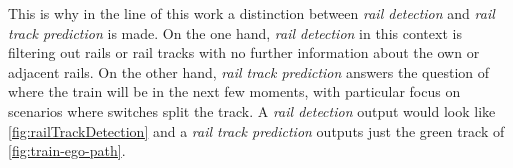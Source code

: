 This is why in the line of this work a distinction between \textit{rail detection} and \textit{rail track prediction} is made.
On the one hand, \textit{rail detection} in this context is filtering out rails or rail tracks with no further information about the own or adjacent rails.
On the other hand, \textit{rail track prediction} answers the question of where the train will be in the next few moments, with particular focus on scenarios where switches split the track.
A \textit{rail detection} output would look like \autoref{fig:railTrackDetection} and a \textit{rail track prediction} outputs just the green track of \autoref{fig:train-ego-path}.


\vspace{0.5cm} %


